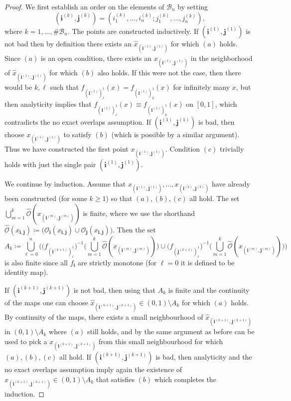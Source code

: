 \documentclass[11pt,]{article}
\theoremstyle{definition}
\theoremstyle{remark}
\newcommand{\0}{\mathbf{0}}
\newcommand{\bi}{\mathbf{i}}
\newcommand{\bj}{\mathbf{j}}
\begin{document}
\begin{proof}
We first establish an order on the elements of $\mathcal{B}_n$ by setting
\[
  (\bi^{(k)},\bj^{(k)})=(i_1^{(k)},\ldots,
i_n^{(k)};j_1^{(k)},\ldots,j_n^{(k)}),
\]
where $k=1,\ldots,\#\mathcal{B}_n$. The points are constructed
inductively. If $(\bi^{(1)},\bj^{(1)})$ is not bad then by definition there exists an $\hat
x_{(\bi^{(1)},\bj^{(1)})}$ for which $(a)$ holds. Since $(a)$ is an open condition, there exists an
$x_{(\bi^{(1)},\bj^{(1)})}$ in the neighborhood of $\hat x_{(\bi^{(1)},\bj^{(1)})}$ for which $(b)$
also holds. If this were not the case, then there would be $k,\ell$ such that
$f_{(\bi^{(1)})_{\ell}^1}(x)=f_{(\bi^{(1)})_{k}^1}(x)$ for infinitely many $x$, but then analyticity
implies that $f_{(\bi^{(1)})_{\ell}^1}(x)\equiv f_{(\bi^{(1)})_{k}^1}(x)$ on $[0,1]$, which contradicts the no
exact overlaps assumption. If $(\bi^{(1)},\bj^{(1)})$ is bad, then choose
$x_{(\bi^{(1)},\bj^{(1)})}$ to satisfy $(b)$ (which is possible by a similar argument). Thus we have
constructed the first point $x_{(\bi^{(1)},\bj^{(1)})}$. Condition $(c)$ trivially holds with just
the single pair $(\bi^{(1)},\bj^{(1)})$. 

We continue by induction. Assume that $x_{(\bi^{(1)},\bj^{(1)})},\ldots,x_{(\bi^{(k)},\bj^{(k)})}$
have already been constructed (for some $k\geq 1$) so that $(a),(b),(c)$ all hold. The set
$\bigcup_{m=1}^k \widehat{\mathcal{O}}(x_{(\bi^{(m)},\bj^{(m)})})$ is finite, where we use the
shorthand  $\widehat{\mathcal{O}}(x_{\bi,\bj})\coloneqq\big(\mathcal{O}_{\bi}(x_{\bi,\bj})\cup
\mathcal{O}_{\bj}(x_{\bi,\bj})\big)$. Then the set
\begin{equation*}
A_k\coloneqq \bigcup_{\ell=0}^n \bigg( \big(f_{(\bi^{(k+1)})_{\ell}^1}\big)^{-1} \Big(
\bigcup_{m=1}^k \widehat{\mathcal{O}}(x_{(\bi^{(m)},\bj^{(m)})}) \Big) \cup
\big(f_{(\bj^{(k+1)})_{\ell}^1}\big)^{-1} \Big( \bigcup_{m=1}^k
\widehat{\mathcal{O}}(x_{(\bi^{(m)},\bj^{(m)})}) \Big) \bigg)
\end{equation*}
is also finite since all $f_{\bi}$ are strictly monotone (for $\ell=0$ it is defined to be identity map). 

If $(\bi^{(k+1)},\bj^{(k+1)})$ is not
bad, then using that $A_k$ is finite and the continuity of the maps one can choose $\hat x_{(\bi^{(k+1)},\bj^{(k+1)})}\in(0,1)\setminus A_k$ for which $(a)$
holds. By continuity of the maps, there exists a small neighbourhood of $\hat
x_{(\bi^{(k+1)},\bj^{(k+1)})}$ in $(0,1)\setminus A_k$ where $(a)$ still holds, and by the same
argument as before can be used to pick a $x_{(\bi^{(k+1)},\bj^{(k+1)})}$ from this small
neighbourhood for which $(a),(b),(c)$ all hold. If $(\bi^{(k+1)},\bj^{(k+1)})$ is bad, then
analyticity and the no exact overlaps assumption imply again the existence of
$x_{(\bi^{(k+1)},\bj^{(k+1)})}\in(0,1)\setminus A_k$ that satisfies $(b)$ which completes the
induction. 
\end{proof}
\end{document}

